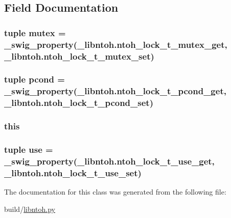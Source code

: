 \subsection{Field Documentation}
\hypertarget{classlibntoh_1_1ntoh__lock__t_a8f7d48b1501f5673c6742b61e778ce01}{
\subsubsection[{mutex}]{\setlength{\rightskip}{0pt plus 5cm}tuple mutex = {\bf \-\_\-swig\-\_\-property}(\-\_\-libntoh.\-ntoh\-\_\-lock\-\_\-t\-\_\-mutex\-\_\-get, \-\_\-libntoh.\-ntoh\-\_\-lock\-\_\-t\-\_\-mutex\-\_\-set)\hspace{0.3cm}{\ttfamily [static]}}}\label{classlibntoh_1_1ntoh__lock__t_a8f7d48b1501f5673c6742b61e778ce01}
\hypertarget{classlibntoh_1_1ntoh__lock__t_a23a951c27c097e73988ca76b59fd56c2}{
\subsubsection[{pcond}]{\setlength{\rightskip}{0pt plus 5cm}tuple pcond = {\bf \-\_\-swig\-\_\-property}(\-\_\-libntoh.\-ntoh\-\_\-lock\-\_\-t\-\_\-pcond\-\_\-get, \-\_\-libntoh.\-ntoh\-\_\-lock\-\_\-t\-\_\-pcond\-\_\-set)\hspace{0.3cm}{\ttfamily [static]}}}\label{classlibntoh_1_1ntoh__lock__t_a23a951c27c097e73988ca76b59fd56c2}
\hypertarget{classlibntoh_1_1ntoh__lock__t_a05c09a5e9d53fa7adf0a7936038c2fa3}{
\subsubsection[{this}]{\setlength{\rightskip}{0pt plus 5cm}this}}\label{classlibntoh_1_1ntoh__lock__t_a05c09a5e9d53fa7adf0a7936038c2fa3}
\hypertarget{classlibntoh_1_1ntoh__lock__t_a8f0e3ca01e3f2f394c20647dcc7abd23}{
\subsubsection[{use}]{\setlength{\rightskip}{0pt plus 5cm}tuple use = {\bf \-\_\-swig\-\_\-property}(\-\_\-libntoh.\-ntoh\-\_\-lock\-\_\-t\-\_\-use\-\_\-get, \-\_\-libntoh.\-ntoh\-\_\-lock\-\_\-t\-\_\-use\-\_\-set)\hspace{0.3cm}{\ttfamily [static]}}}\label{classlibntoh_1_1ntoh__lock__t_a8f0e3ca01e3f2f394c20647dcc7abd23}


The documentation for this class was generated from the following file\-:\begin{DoxyCompactItemize}
\item 
build/\hyperlink{libntoh_8py}{libntoh.\-py}\end{DoxyCompactItemize}
